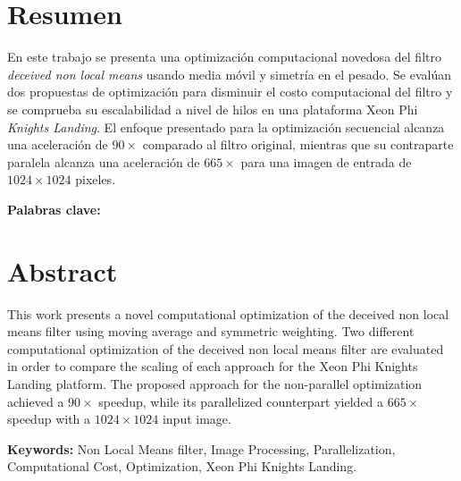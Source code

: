 \chapter*{Resumen}
\thispagestyle{empty}

En este trabajo se presenta una optimizaci\'on computacional novedosa del filtro \textit{deceived non local means} usando media m\'ovil y simetr\'ia en el pesado. Se eval\'uan dos propuestas de optimizaci\'on para disminuir el costo computacional del filtro y se comprueba su escalabilidad a nivel de hilos en una plataforma  Xeon Phi \textit{Knights Landing}. El enfoque presentado para la optimizaci\'on secuencial alcanza una aceleraci\'on de $90\times$ comparado al filtro original, mientras que su contraparte paralela alcanza una aceleraci\'on de $665\times$ para una imagen de entrada de $1024\times1024$ pixeles.

\bigskip

\textbf{Palabras clave:} \scriptKeywords

\clearpage
\chapter*{Abstract}
\thispagestyle{empty}

This work presents a novel computational optimization of the deceived non local means filter using moving average and symmetric weighting. Two different computational optimization of the deceived non local means filter are evaluated in order to compare the scaling of each approach for the Xeon Phi Knights Landing platform. The proposed approach for the non-parallel optimization achieved a $90\times$ speedup, while its parallelized counterpart yielded a $665\times$ speedup with a $1024\times1024$ input image. 

\bigskip

\textbf{Keywords:} Non Local Means filter, Image Processing, Parallelization, Computational Cost, Optimization, Xeon Phi Knights Landing.

\cleardoublepage

